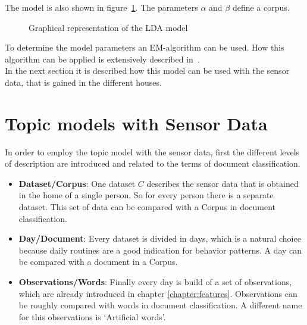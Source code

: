 The model is also shown in figure~\ref{fig:modelBasic}. The parameters $\alpha$ and $\beta$ define a corpus.

\begin{figure}[h!]
\centering
\def\svgwidth{400pt}

\caption{Graphical representation of the LDA model}
\label{fig:modelBasic}
\end{figure}

To determine the model parameters an EM-algorithm can be used. How this algorithm can be applied is extensively described in~\cite{blei2003latent}. \\
In the next section it is described how this model can be used with the sensor data, that is gained in the different houses.


\section{Topic models with Sensor Data}

In order to employ the topic model with the sensor data, first the different levels of description are introduced and related to the terms of document classification.
\begin{itemize}
 \item \textbf{Dataset/Corpus}: One dataset $C$ describes the sensor data that is obtained in the home of a single person. So for every person there is a separate dataset. This set of data can be compared with a Corpus in document classification.
 \item \textbf{Day/Document}: Every dataset is divided in days, which is a natural choice because daily routines are a good indication for behavior patterns. A day can be compared with a document in a Corpus.
 \item \textbf{Observations/Words}: Finally every day is build of a set of observations, which are already introduced in chapter \ref{chapter:features}. Observations can be roughly compared with words in document classification. A different name for this observations is  `Artificial words'.
\end{itemize}

